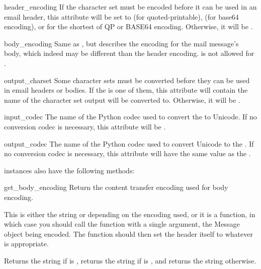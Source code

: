\begin{datadesc}{header_encoding}
If the character set must be encoded before it can be used in an
email header, this attribute will be set to  (for
quoted-printable),  (for base64 encoding), or
 for the shortest of QP or BASE64 encoding.
Otherwise, it will be .
\end{datadesc}

\begin{datadesc}{body_encoding}
Same as , but describes the encoding for the
mail message's body, which indeed may be different than the header
encoding.   is not allowed for
.
\end{datadesc}

\begin{datadesc}{output_charset}
Some character sets must be converted before they can be used in
email headers or bodies.  If the  is one of
them, this attribute will contain the name of the character set
output will be converted to.  Otherwise, it will be .
\end{datadesc}

\begin{datadesc}{input_codec}
The name of the Python codec used to convert the  to
Unicode.  If no conversion codec is necessary, this attribute will be
.
\end{datadesc}

\begin{datadesc}{output_codec}
The name of the Python codec used to convert Unicode to the
.  If no conversion codec is necessary, this
attribute will have the same value as the .
\end{datadesc}

 instances also have the following methods:

\begin{methoddesc}[Charset]{get_body_encoding}{}
Return the content transfer encoding used for body encoding.

This is either the string  or 
depending on the encoding used, or it is a function, in which case you
should call the function with a single argument, the Message object
being encoded.  The function should then set the
 header itself to whatever is
appropriate.

Returns the string  if
 is , returns the string
 if  is , and returns the
string  otherwise.
\end{methoddesc}

